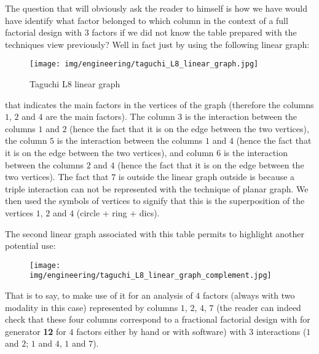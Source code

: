 	The question that will obviously ask the reader to himself is how we have would have identify what factor belonged to which column in the context of a full factorial design with $3$ factors if we did not know the table prepared with the techniques view previously? Well  in fact just by using the following linear graph:
	\begin{figure}[H]
		\begin{center}
		\texttt{[image: img/engineering/taguchi\_L8\_linear\_graph.jpg]}
		\caption{Taguchi L8 linear graph}
		\end{center}	
	\end{figure}
	that indicates the main factors in the vertices of the graph (therefore the columns $1$, $2$ and $4$ are the main factors). The column $3$ is the interaction between the columns $1$ and $2$ (hence the fact that it is on the edge between the two vertices), the column $5$ is the interaction between the columns $1$ and $4$ (hence the fact that it is on the edge between the two vertices), and column $6$ is the interaction between the columns $2$ and $4$ (hence the fact that it is on the edge between the two vertices). The fact that $7$ is outside the linear graph outside is because a triple interaction can not be represented with the technique of planar graph. We then used the symbols of vertices to signify that this is the superposition of the vertices $1$, $2$ and $4$ (circle + ring + dics).

	The second linear graph associated with this table permits to highlight another potential use:
	\begin{figure}[H]
		\begin{center}
		\texttt{[image: img/engineering/taguchi\_L8\_linear\_graph\_complement.jpg]}
		\end{center}	
	\end{figure}
	That is to say, to make use of it for an analysis of $4$ factors (always with two modality in this case) represented by columns $1$, $2$, $4$, $7$ (the reader can indeed check that these four columns correspond to a fractional factorial design with for generator \textbf{12} for $4$ factors either by hand or with software) with $3$ interactions ($1$ and $2$; $1$ and $4$, $1$ and $7$).
	
